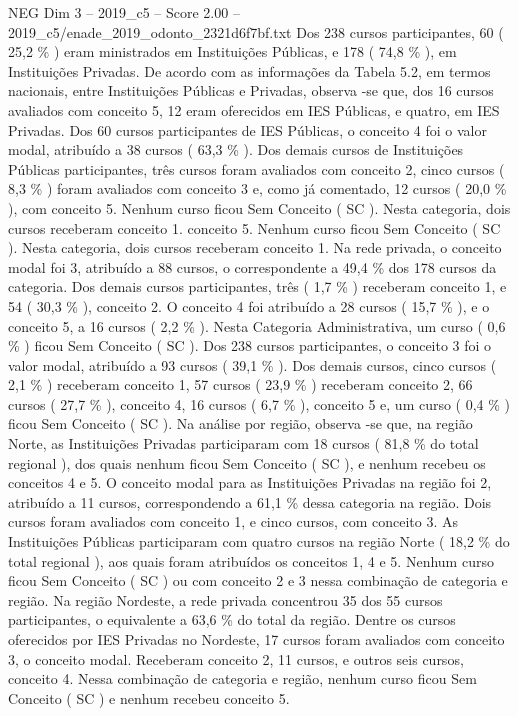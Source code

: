 \begin{textsample}{NEG Dim 3 – 2019\_c5 – Score 2.00 – 2019\_c5/enade\_2019\_odonto\_2321d6f7bf.txt}
Dos 238 cursos participantes, 60 ( 25,2 \% ) eram ministrados em Instituições Públicas, e 178 ( 74,8 \% ), em Instituições Privadas.
De acordo com as informações da Tabela 5.2, em termos nacionais, entre Instituições Públicas e Privadas, observa -se que, dos 16 cursos avaliados com conceito 5, 12 eram oferecidos em IES Públicas, e quatro, em IES Privadas.
Dos 60 cursos participantes de IES Públicas, o conceito 4 foi o valor modal, atribuído a 38 cursos ( 63,3 \% ).
Dos demais cursos de Instituições Públicas participantes, três cursos foram avaliados com conceito 2, cinco cursos ( 8,3 \% ) foram avaliados com conceito 3 e, como já comentado, 12 cursos ( 20,0 \% ), com conceito 5.
Nenhum curso ficou Sem Conceito ( SC ).
Nesta categoria, dois cursos receberam conceito 1. conceito 5.
Nenhum curso ficou Sem Conceito ( SC ).
Nesta categoria, dois cursos receberam conceito 1.
Na rede privada, o conceito modal foi 3, atribuído a 88 cursos, o correspondente a 49,4 \% dos 178 cursos da categoria.
Dos demais cursos participantes, três ( 1,7 \% ) receberam conceito 1, e 54 ( 30,3 \% ), conceito 2.
O conceito 4 foi atribuído a 28 cursos ( 15,7 \% ), e o conceito 5, a 16 cursos ( 2,2 \% ).
Nesta Categoria Administrativa, um curso ( 0,6 \% ) ficou Sem Conceito ( SC ).
Dos 238 cursos participantes, o conceito 3 foi o valor modal, atribuído a 93 cursos ( 39,1 \% ).
Dos demais cursos, cinco cursos ( 2,1 \% ) receberam conceito 1, 57 cursos ( 23,9 \% ) receberam conceito 2, 66 cursos ( 27,7 \% ), conceito 4, 16 cursos ( 6,7 \% ), conceito 5 e, um curso ( 0,4 \% ) ficou Sem Conceito ( SC ).
Na análise por região, observa -se que, na região Norte, as Instituições Privadas participaram com 18 cursos ( 81,8 \% do total regional ), dos quais nenhum ficou Sem Conceito ( SC ), e nenhum recebeu os conceitos 4 e 5.
O conceito modal para as Instituições Privadas na região foi 2, atribuído a 11 cursos, correspondendo a 61,1 \% dessa categoria na região.
Dois cursos foram avaliados com conceito 1, e cinco cursos, com conceito 3.
As Instituições Públicas participaram com quatro cursos na região Norte ( 18,2 \% do total regional ), aos quais foram atribuídos os conceitos 1, 4 e 5.
Nenhum curso ficou Sem Conceito ( SC ) ou com conceito 2 e 3 nessa combinação de categoria e região.
Na região Nordeste, a rede privada concentrou 35 dos 55 cursos participantes, o equivalente a 63,6 \% do total da região.
Dentre os cursos oferecidos por IES Privadas no Nordeste, 17 cursos foram avaliados com conceito 3, o conceito modal.
Receberam conceito 2, 11 cursos, e outros seis cursos, conceito 4.
Nessa combinação de categoria e região, nenhum curso ficou Sem Conceito ( SC ) e nenhum recebeu conceito 5.

\end{textsample}
